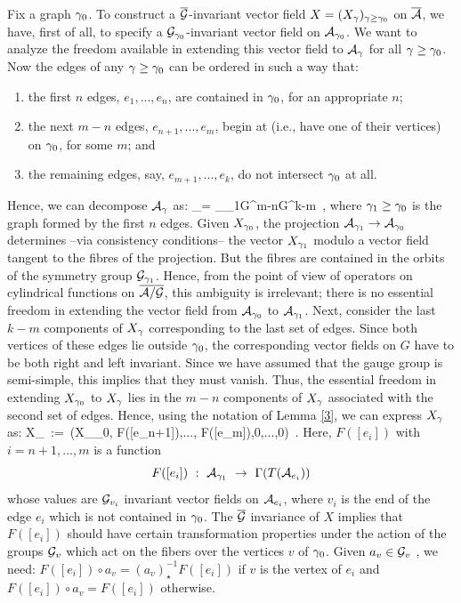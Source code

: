 Fix a graph $\gamma_0$. To construct a ${\overline {{\cal G}}}$-invariant vector field $X
=(X_\gamma)_{\gamma\ge\gamma_0}$ on ${\overline {{\cal A}}}$, we have, first of all, to specify a
${\cal G}_{\gamma_0}$-invariant vector field on ${\cal A}_{\gamma_0}$. We want to analyze
the freedom available in extending this vector field to ${\cal A}_\gamma$ for all
$\gamma\ge \gamma_0$. Now the edges of any $\gamma\ge \gamma_0$ can be ordered in such
a way that:
\begin{enumerate}
\item the first $n$ edges, ${e}_1,...,e_{n}$, are contained in $\gamma_0$,
for an appropriate $n$;
\item the next $m-n$ edges, ${e}_{n+1},...,e_{m}$, begin at (i.e., have
one of their vertices) on $\gamma_0$, for some $m$; and
\item the remaining edges, say, $e_{m+1}, ..., e_{k}$, do not intersect 
$\gamma_0$ at all.
\end{enumerate}
Hence, we can decompose ${\cal A}_\gamma$ as:
\be
{\A_{\g}}= \A_{\g_1}\times G^{m-n}\times G^{k-m}\ ,
\ee
where $\gamma_1\geq\gamma_0$ is the graph formed by the first $n$ edges.
Given $X_{\gamma_0}$, the projection ${\cal A}_{\gamma_1} \rightarrow {\cal A}_{\gamma_{0}}$
determines --via consistency conditions-- the vector $X_{\gamma_1}$ modulo
a vector field tangent to the fibres of the projection. But the fibres
are contained in the orbits of the symmetry group ${\cal G}_{\gamma_1}$. Hence,
from the point of view of operators on cylindrical functions on
$\overline{{\cal A}/{\cal G}}$, this ambiguity is irrelevant; there is no essential freedom in
extending the vector field from ${\cal A}_{\gamma_0}$ to ${\cal A}_{\gamma_1}$. Next,
consider the last $k-m$ components of $X_{\gamma}$ corresponding to the
last set of edges. Since both vertices of these edges lie outside
$\gamma_0$, the corresponding vector fields on $G$ have to be both right
and left invariant. Since we have assumed that the gauge group is
semi-simple, this implies that they must vanish. Thus, the essential
freedom in extending $X_{\gamma_0}$ to $X_{\gamma}$ lies in the $m-n$
components of $X_\gamma$ associated with the second set of edges. Hence,
using the notation of Lemma \ref{3}, we can express $X_\gamma$ as:
\be
X_\g\ :=\ (X_{\g_0}, F([e_{n+1}]),..., F([e_{m}]),0,...,0)\ . 
\ee
Here, $F([e_i])$ with $i =n+1, ..., m$ is a function 
%
$$F([e_i])\ :\   \A_{\g_1}\ \rightarrow \ \Gamma(T(\A_{e_i})) $$
%
whose values are ${\cal G}_{v_i}$ invariant vector fields on ${\cal A}_{e_i}$,
where $v_i$ is the end of the edge $e_i$ which is not contained in
$\gamma_0$. The ${\overline {{\cal G}}}$ invariance of $X$ implies that $F([e_i])$ should
have certain transformation properties under the action of the groups
${\cal G}_v$ which act on the fibers over the vertices $v$ of $\gamma_0$.  Given
$a_v\in {\cal G}_v$ , we need: $F([e_i]) \circ a_v = (a_v)^{-1}_\star {F}
([e_i])$ if $v$ is the vertex of $e_i$ and $F([e_i])\circ a_v =
F([e_i])$ otherwise.

